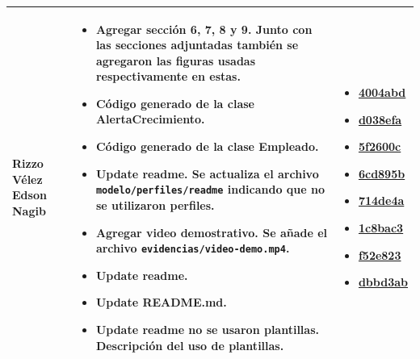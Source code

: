\documentclass[11pt,a4paper]{article}
\begin{document}
\begin{tabularx}{\textwidth}{
>{\raggedright\arraybackslash}p{}
>{\raggedright\arraybackslash}X
>{\raggedright\arraybackslash}p{}
}
Rizzo Vélez Edson Nagib &
\begin{itemize}[leftmargin=*,nosep,itemsep=2pt]
    \item \textbf{Agregar sección 6, 7, 8 y 9.} Junto con las secciones adjuntadas también se agregaron las figuras usadas respectivamente en estas.
    \item \textbf{Código generado de la clase AlertaCrecimiento.}
    \item \textbf{Código generado de la clase Empleado.}
    \item \textbf{Update readme.} Se actualiza el archivo \texttt{modelo/perfiles/readme} indicando que no se utilizaron perfiles.
    \item \textbf{Agregar video demostrativo.} Se añade el archivo \texttt{evidencias/video-demo.mp4}.
    \item \textbf{Update readme.}
    \item \textbf{Update README.md.}
    \item \textbf{Update readme no se usaron plantillas.} Descripción del uso de plantillas.
\end{itemize} &
\begin{itemize}[leftmargin=*,nosep,itemsep=2pt]
    \item \href{https://github.com/erizzov-boop/PFC-AquaGest-MDD-Equipo_D-/commit/4004abddd626857ddcc8d418f9c7ef1a36a638d6}{4004abd}
    \item \href{https://github.com/erizzov-boop/PFC-AquaGest-MDD-Equipo_D-/commit/d038efa7f5951c64e846ba8c8aea5a2c17b7d7ea}{d038efa}
    \item \href{https://github.com/erizzov-boop/PFC-AquaGest-MDD-Equipo_D-/commit/5f2600cfd15a637b67cd662eee6f198a3014f253}{5f2600c}
    \item \href{https://github.com/erizzov-boop/PFC-AquaGest-MDD-Equipo_D-/commit/6cd895bc7a4abd72daffeaf900c7b995d1aa9fe1}{6cd895b}
    \item \href{https://github.com/erizzov-boop/PFC-AquaGest-MDD-Equipo_D-/commit/714de4a616b28aa90208116057237273ccc0f9f8}{714de4a}
    \item \href{https://github.com/erizzov-boop/PFC-AquaGest-MDD-Equipo_D-/commit/1c8bac3e1705e6a99e8a3254a9cbc985ae59c9e1}{1c8bac3}
    \item \href{https://github.com/erizzov-boop/PFC-AquaGest-MDD-Equipo_D-/commit/f52e82325b3fcdbb94d24648461c7dce836de557}{f52e823}
    \item \href{https://github.com/erizzov-boop/PFC-AquaGest-MDD-Equipo_D-/commit/dbbd3ab99325e0459107ef74bf4304efb6380663}{dbbd3ab}
\end{itemize} \\

\bottomrule
\end{tabularx}
\end{document}
